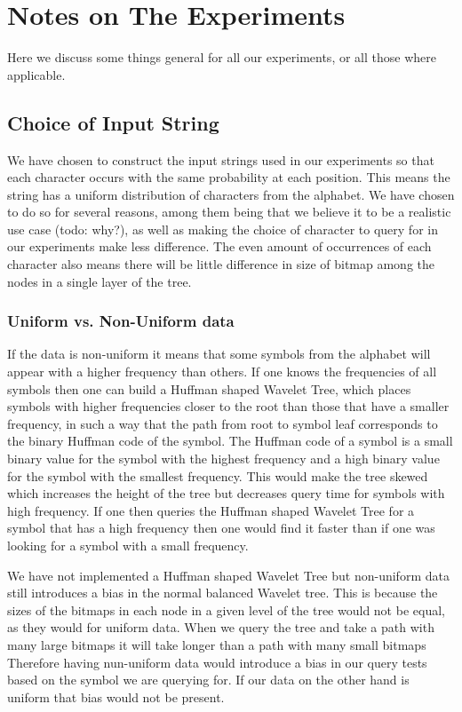 \section{Notes on The Experiments}
Here we discuss some things general for all our experiments, or all those where applicable.

\subsection{Choice of Input String}
We have chosen to construct the input strings used in our experiments so that each character occurs with the same probability at each position.
This means the string has a uniform distribution of characters from the alphabet.
We have chosen to do so for several reasons, among them being that we believe it to be a realistic use case (todo: why?), as well as making the choice of character to query for in our experiments make less difference.
The even amount of occurrences of each character also means there will be little difference in size of bitmap among the nodes in a single layer of the tree.

\subsubsection{Uniform vs. Non-Uniform data}
If the data is non-uniform it means that some symbols from the alphabet will appear with a higher frequency than others.
If one knows the frequencies of all symbols then one can build a Huffman shaped Wavelet Tree, which places symbols with higher frequencies closer to the root than those that have a smaller frequency, in such a way that the path from root to symbol leaf corresponds to the binary Huffman code of the symbol. 
The Huffman code of a symbol is a small binary value for the symbol with the highest frequency and a high binary value for the symbol with the smallest frequency.
This would make the tree skewed which increases the height of the tree but decreases query time for symbols with high frequency.
If one then queries the Huffman shaped Wavelet Tree for a symbol that has a high frequency then one would find it faster than if one was looking for a symbol with a small frequency.

We have not implemented a Huffman shaped Wavelet Tree but non-uniform data still introduces a bias in the normal balanced Wavelet tree.
This is because the sizes of the bitmaps in each node in a given level of the tree would not be equal, as they would for uniform data.
When we query the tree and take a path with many large bitmaps it will take longer than a path with many small bitmaps
Therefore having nun-uniform data would introduce a bias in our query tests based on the symbol we are querying for. 
If our data on the other hand is uniform that bias would not be present.


